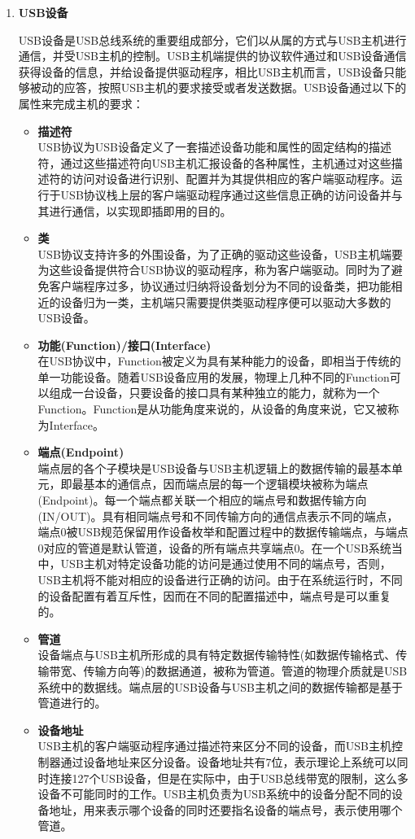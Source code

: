 \begin{enumerate}
\item \textbf{USB设备}

	USB设备是USB总线系统的重要组成部分，它们以从属的方式与USB主机进行通信，并受USB主机的控制。USB主机端提供的协议软件通过和USB设备通信获得设备的信息，并给设备提供驱动程序，相比USB主机而言，USB设备只能够被动的应答，按照USB主机的要求接受或者发送数据。USB设备通过以下的属性来完成主机的要求：
	\begin{itemize}
	\item \textbf{描述符}\\
	USB协议为USB设备定义了一套描述设备功能和属性的固定结构的描述符，通过这些描述符向USB主机汇报设备的各种属性，主机通过对这些描述符的访问对设备进行识别、配置并为其提供相应的客户端驱动程序。运行于USB协议栈上层的客户端驱动程序通过这些信息正确的访问设备并与其进行通信，以实现即插即用的目的。
	\item \textbf{类}\\
	USB协议支持许多的外围设备，为了正确的驱动这些设备，USB主机端要为这些设备提供符合USB协议的驱动程序，称为客户端驱动。同时为了避免客户端程序过多，协议通过归纳将设备划分为不同的设备类，把功能相近的设备归为一类，主机端只需要提供类驱动程序便可以驱动大多数的USB设备。	
	\item \textbf{功能(Function)/接口(Interface)}\\
	在USB协议中，Function被定义为具有某种能力的设备，即相当于传统的单一功能设备。随着USB设备应用的发展，物理上几种不同的Function可以组成一台设备，只要设备的接口具有某种独立的能力，就称为一个Function。Function是从功能角度来说的，从设备的角度来说，它又被称为Interface。
	\item \textbf{端点(Endpoint)}\\
	端点层的各个子模块是USB设备与USB主机逻辑上的数据传输的最基本单元，即最基本的通信点，因而端点层的每一个逻辑模块被称为端点(Endpoint)。每一个端点都关联一个相应的端点号和数据传输方向(IN/OUT)。具有相同端点号和不同传输方向的通信点表示不同的端点，端点0被USB规范保留用作设备枚举和配置过程中的数据传输端点，与端点0对应的管道是默认管道，设备的所有端点共享端点0。在一个USB系统当中，USB主机对特定设备功能的访问是通过使用不同的端点号，否则，USB主机将不能对相应的设备进行正确的访问。由于在系统运行时，不同的设备配置有着互斥性，因而在不同的配置描述中，端点号是可以重复的。
	\item \textbf{管道}\\
	设备端点与USB主机所形成的具有特定数据传输特性(如数据传输格式、传输带宽、传输方向等)的数据通道，被称为管道。管道的物理介质就是USB系统中的数据线。端点层的USB设备与USB主机之间的数据传输都是基于管道进行的。
	\item \textbf{设备地址}\\
	USB主机的客户端驱动程序通过描述符来区分不同的设备，而USB主机控制器通过设备地址来区分设备。设备地址共有7位，表示理论上系统可以同时连接127个USB设备，但是在实际中，由于USB总线带宽的限制，这么多设备不可能同时的工作。USB主机负责为USB系统中的设备分配不同的设备地址，用来表示哪个设备的同时还要指名设备的端点号，表示使用哪个管道。
	\end{itemize}	
	
\end{enumerate}



